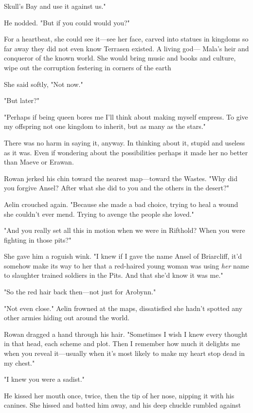 Skull's Bay  and use it against us."

He nodded. "But if you could  would you?"

For a heartbeat, she could see it---see her face, carved into statues in kingdoms so far away they did not even know Terrasen existed. A living god--- Mala's heir and conqueror of the known world. She would bring music and books and culture, wipe out the corruption festering in corners of the earth 

She said softly, "Not now."

"But later?"

"Perhaps if being queen bores me  I'll think about making myself empress. To give my offspring not one kingdom to inherit, but as many as the stars."

There was no harm in saying it, anyway. In thinking about it, stupid and useless as it was. Even if wondering about the possibilities 
perhaps it made her no better than Maeve or Erawan.

Rowan jerked his chin toward the nearest map---toward the Wastes. "Why did you forgive Ansel? After what she did to you and the others in the desert?"

Aelin crouched again. "Because she made a bad choice, trying to heal a wound she couldn't ever mend. Trying to avenge the people she loved."

"And you really set all this in motion when we were in Rifthold? When you were fighting in those pits?"

She gave him a roguish wink. "I knew if I gave the name Ansel of Briarcliff, it'd somehow make its way to her that a red-haired young woman was using \emph{her} name to slaughter trained soldiers in the Pits. And that she'd know it was me."

"So the red hair back then---not just for Arobynn."

"Not even close." Aelin frowned at the maps, dissatisfied she hadn't spotted any other armies hiding out around the world.

Rowan dragged a hand through his hair. "Sometimes I wish I knew every thought in that head, each scheme and plot. Then I remember how much it delights me when you reveal it---usually when it's most likely to make my heart stop dead in my chest."

"I knew you were a sadist."

He kissed her mouth once, twice, then the tip of her nose, nipping it with his canines. She hissed and batted him away, and his deep chuckle rumbled against

